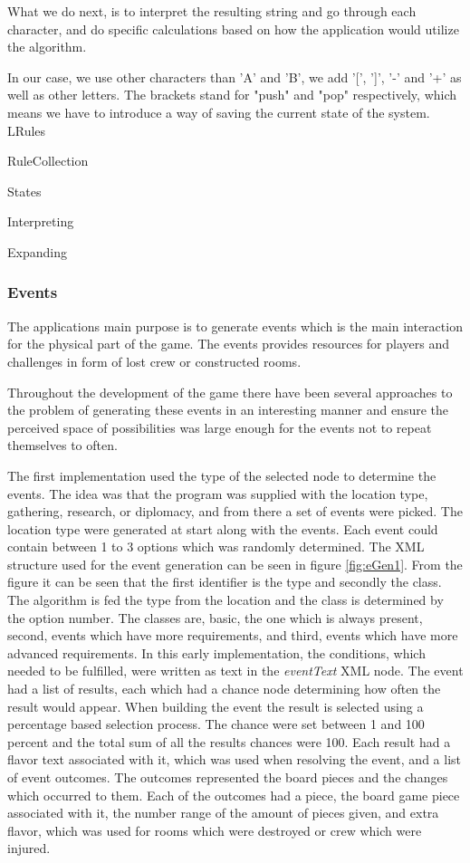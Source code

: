 What we do next, is to interpret the resulting string and go through each character, and do specific calculations based on how the application would utilize the algorithm.

In our case, we use other characters than 'A' and 'B', we add '[', ']', '-' and '+' as well as other letters. The brackets stand for "push" and "pop" respectively, which means we have to introduce a way of saving the current state of the system.\\


LRules

RuleCollection

States

Interpreting

Expanding
\subsubsection{Events}
The applications main purpose is to generate events which is the main interaction for the physical part of the game. The events provides resources for players and challenges in form of lost crew or constructed rooms.

Throughout the development of the game there have been several approaches to the problem of generating these events in an interesting manner and ensure the perceived space of possibilities was large enough for the events not to repeat themselves to often.

The first implementation used the type of the selected node to determine the events.
The idea was that the program was supplied with the location type, gathering, research, or diplomacy, and from there a set of events were picked. The location type were generated at start along with the events. 
Each event could contain between 1 to 3 options which was randomly determined.
The XML structure used for the event generation can be seen in figure \ref{fig:eGen1}.
From the figure it can be seen that the first identifier is the type and secondly the class. The algorithm is fed the type from the location and the class is determined by the option number. The classes are, basic, the one which is always present, second, events which have more requirements, and third, events which have more advanced requirements. 
In this early implementation, the conditions, which needed to be fulfilled, were written as text in the \textit{eventText} XML node. 
The event had a list of results, each which had a chance node determining how often the result would appear. When building the event the result is selected using a percentage based selection process. The chance were set between 1 and 100 percent and the total sum of all the results chances were 100. 
Each result had a flavor text associated with it, which was used when resolving the event, and a list of event outcomes. 
The outcomes represented the board pieces and the changes which occurred to them. Each of the outcomes had a piece, the board game piece associated with it, the number range of the amount of pieces given, and extra flavor, which was used for rooms which were destroyed or crew which were injured.

